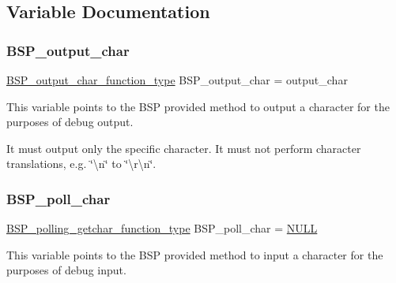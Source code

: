 \subsection{Variable Documentation}
\mbox{\label{arm_2raspberrypi_2console_2console-config_8c_a5fb8c9c4f076f0340b4a17ed432ced5c}} 
\subsubsection{\texorpdfstring{BSP\_output\_char}{BSP\_output\_char}}
{\footnotesize\ttfamily \mbox{\hyperlink{bspIo_8h_a0b0dff1c3d35110ae303b4098c60dc14}{B\+S\+P\+\_\+output\+\_\+char\+\_\+function\+\_\+type}} B\+S\+P\+\_\+output\+\_\+char = output\+\_\+char}

This variable points to the B\+SP provided method to output a character for the purposes of debug output.

It must output only the specific character. It must not perform character translations, e.\+g. \char`\"{}\textbackslash{}n\char`\"{} to \char`\"{}\textbackslash{}r\textbackslash{}n\char`\"{}. \mbox{\label{arm_2raspberrypi_2console_2console-config_8c_ae5846eecdfa8f2813504371bf01c29b0}} 
\subsubsection{\texorpdfstring{BSP\_poll\_char}{BSP\_poll\_char}}
{\footnotesize\ttfamily \mbox{\hyperlink{bspIo_8h_a132b9ceff428a634ece5dfaac7ef1006}{B\+S\+P\+\_\+polling\+\_\+getchar\+\_\+function\+\_\+type}} B\+S\+P\+\_\+poll\+\_\+char = \mbox{\hyperlink{bestcomm__api_8h_a872bb74de61c3689ccd5b41873fce42c}{N\+U\+LL}}}

This variable points to the B\+SP provided method to input a character for the purposes of debug input. 